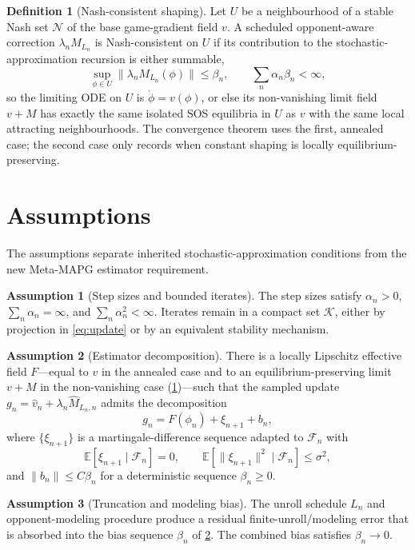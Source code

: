 \documentclass{article}
\theoremstyle{plain}
\theoremstyle{definition}
\newtheorem{assumption}{Assumption}
\newtheorem{definition}[theorem]{Definition}
\theoremstyle{remark}
\newcommand{\E}{\mathbb{E}}
\newcommand{\K}{\mathcal{K}}
\newcommand{\N}{\mathcal{N}}
\newcommand{\F}{\mathcal{F}}
\begin{document}
\begin{definition}[Nash-consistent shaping]\label{def:nash-consistent}
Let $U$ be a neighbourhood of a stable Nash set $\N$ of the base game-gradient field $v$. A scheduled opponent-aware correction $\lambda_n M_{L_n}$ is Nash-consistent on $U$ if its contribution to the stochastic-approximation recursion is either summable,
\[
\sup_{\phi\in U}\|\lambda_n M_{L_n}(\phi)\|\le \beta_n,
\qquad \sum_n \alpha_n\beta_n<\infty,
\]
so the limiting ODE on $U$ is $\dot\phi=v(\phi)$, or else its non-vanishing limit field $v+M$ has exactly the same isolated SOS equilibria in $U$ as $v$ with the same local attracting neighbourhoods. The convergence theorem uses the first, annealed case; the second case only records when constant shaping is locally equilibrium-preserving.
\end{definition}

\section{Assumptions}\label{sec:assumptions}

The assumptions separate inherited stochastic-approximation conditions from the new Meta-MAPG estimator requirement.

\begin{assumption}[Step sizes and bounded iterates]\label{as:steps}
The step sizes satisfy $\alpha_n>0$, $\sum_n\alpha_n=\infty$, and $\sum_n\alpha_n^2<\infty$. Iterates remain in a compact set $\K$, either by projection in \eqref{eq:update} or by an equivalent stability mechanism.
\end{assumption}

\begin{assumption}[Estimator decomposition]\label{as:decomp}
There is a locally Lipschitz effective field $F$---equal to $v$ in the annealed case and to an equilibrium-preserving limit $v+M$ in the non-vanishing case (\cref{def:nash-consistent})---such that the sampled update $g_n=\hat v_n+\lambda_n\hat M_{L_n,n}$ admits the decomposition
\[
g_n=F(\phi_n)+\xi_{n+1}+b_n,
\]
where $\{\xi_{n+1}\}$ is a martingale-difference sequence adapted to $\F_n$ with
\[
\E[\xi_{n+1}\mid\F_n]=0,\qquad
\E[\|\xi_{n+1}\|^2\mid\F_n]\le \sigma^2,
\]
and $\|b_n\|\le C\beta_n$ for a deterministic sequence $\beta_n\ge 0$.
\end{assumption}

\begin{assumption}[Truncation and modeling bias]\label{as:trunc}
The unroll schedule $L_n$ and opponent-modeling procedure produce a residual finite-unroll/modeling error that is absorbed into the bias sequence $\beta_n$ of \cref{as:decomp}. The combined bias satisfies $\beta_n\to 0$.
\end{assumption}
\end{document}
